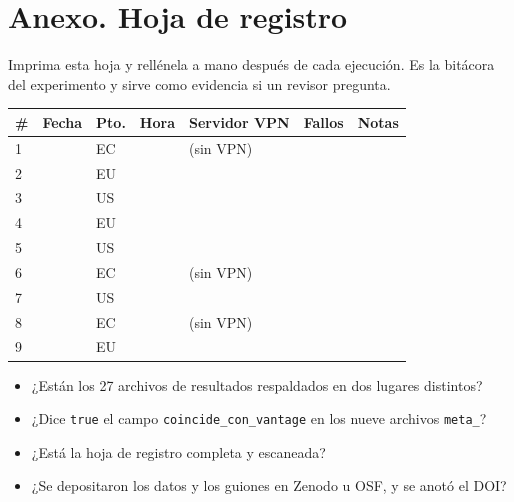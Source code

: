 \documentclass[11pt,a4paper]{article}
\begin{document}
\section{Anexo. Hoja de registro}\label{sec:hoja}

Imprima esta hoja y rellénela a mano después de cada ejecución. Es la bitácora del experimento y sirve como evidencia si un revisor pregunta.

\vspace{0.6cm}

\renewcommand{\arraystretch}{2.4}
\begin{center}
	\begin{tabular}{@{}p{0.5cm}p{1.3cm}p{0.9cm}p{1.6cm}p{2.8cm}p{1.3cm}p{2.4cm}@{}}
		\toprule
		\footnotesize\textbf{\#} & \footnotesize\textbf{Fecha} & \footnotesize\textbf{Pto.} & \footnotesize\textbf{Hora} & \footnotesize\textbf{Servidor VPN} & \footnotesize\textbf{Fallos} & \footnotesize\textbf{Notas} \\
		\midrule
		1 & & EC & & (sin VPN) & & \\ \hline
		2 & & EU & & & & \\ \hline
		3 & & US & & & & \\ \hline
		4 & & EU & & & & \\ \hline
		5 & & US & & & & \\ \hline
		6 & & EC & & (sin VPN) & & \\ \hline
		7 & & US & & & & \\ \hline
		8 & & EC & & (sin VPN) & & \\ \hline
		9 & & EU & & & & \\
		\bottomrule
	\end{tabular}
\end{center}
\renewcommand{\arraystretch}{1.0}

\vspace{1.0cm}

\begin{nota}
	\begin{itemize}
		\item ¿Están los 27 archivos de resultados respaldados en dos lugares distintos?
		\item ¿Dice \texttt{true} el campo \texttt{coincide\_con\_vantage} en los nueve archivos \texttt{meta\_}?
		\item ¿Está la hoja de registro completa y escaneada?
		\item ¿Se depositaron los datos y los guiones en Zenodo u OSF, y se anotó el DOI?
	\end{itemize}
\end{nota}
\end{document}
